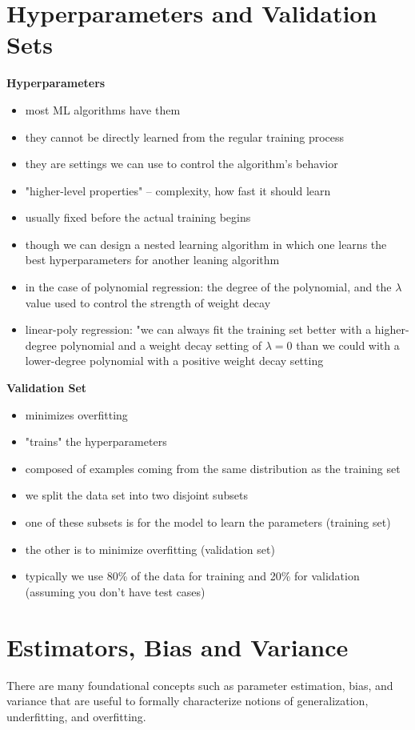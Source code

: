 \documentclass[11pt, twocolumn]{report}
\begin{document}
\section{Hyperparameters and Validation Sets}
\textbf{Hyperparameters}
\begin{itemize}
  \item most ML algorithms have them
  \item they cannot be directly learned from the regular training process
  \item they are settings we can use to control the algorithm's behavior
  \item "higher-level properties" -- complexity, how fast it should learn
  \item usually fixed before the actual training begins
  \item though we can design a nested learning algorithm in which one learns
    the best hyperparameters for another leaning algorithm
  \item in the case of polynomial regression: the degree of the polynomial, and
    the $\lambda$ value used to control the strength of weight decay
  \item linear-poly regression: "we can always fit the training set better with
    a higher-degree polynomial and a weight decay setting of $\lambda = 0$ than
    we could with a lower-degree polynomial with a positive weight decay
    setting
\end{itemize}
\textbf{Validation Set}
\begin{itemize}
  \item minimizes overfitting
  \item "trains" the hyperparameters
  \item composed of examples coming from the same distribution as the training
    set
  \item we split the data set into two disjoint subsets
  \item one of these subsets is for the model to learn the parameters (training
    set)
  \item the other is to minimize overfitting (validation set)
  \item typically we use 80\% of the data for training and 20\% for validation
    (assuming you don't have test cases)
\end{itemize}

\section{Estimators, Bias and Variance}
There are many foundational concepts such as parameter estimation, bias, and
variance that are useful to formally characterize notions of generalization,
underfitting, and overfitting.
\end{document}
